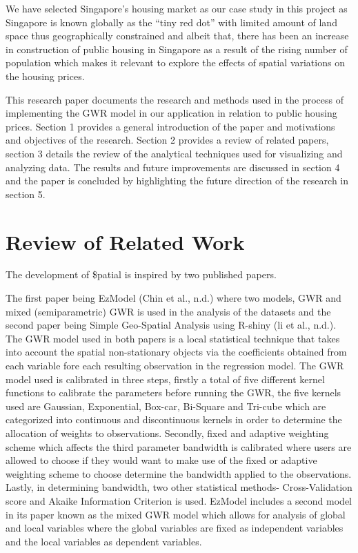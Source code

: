 \documentclass{acm_proc_article-sp}
\begin{document}
We have selected Singapore's housing market as our case study in this
project as Singapore is known globally as the ``tiny red dot'' with
limited amount of land space thus geographically constrained and albeit
that, there has been an increase in construction of public housing in
Singapore as a result of the rising number of population which makes it
relevant to explore the effects of spatial variations on the housing
prices.

This research paper documents the research and methods used in the
process of implementing the GWR model in our application in relation to
public housing prices. Section 1 provides a general introduction of the
paper and motivations and objectives of the research. Section 2 provides
a review of related papers, section 3 details the review of the
analytical techniques used for visualizing and analyzing data. The
results and future improvements are discussed in section 4 and the paper
is concluded by highlighting the future direction of the research in
section 5.

\hypertarget{review-of-related-work}{%
\section{Review of Related Work}\label{review-of-related-work}}

The development of \$patial is inspired by two published papers.

The first paper being EzModel (Chin et al., n.d.) where two models, GWR
and mixed (semiparametric) GWR is used in the analysis of the datasets
and the second paper being Simple Geo-Spatial Analysis using R-shiny (li
et al., n.d.). The GWR model used in both papers is a local statistical
technique that takes into account the spatial non-stationary objects via
the coefficients obtained from each variable fore each resulting
observation in the regression model. The GWR model used is calibrated in
three steps, firstly a total of five different kernel functions to
calibrate the parameters before running the GWR, the five kernels used
are Gaussian, Exponential, Box-car, Bi-Square and Tri-cube which are
categorized into continuous and discontinuous kernels in order to
determine the allocation of weights to observations. Secondly, fixed and
adaptive weighting scheme which affects the third parameter bandwidth is
calibrated where users are allowed to choose if they would want to make
use of the fixed or adaptive weighting scheme to choose determine the
bandwidth applied to the observations. Lastly, in determining bandwidth,
two other statistical methods- Cross-Validation score and Akaike
Information Criterion is used. EzModel includes a second model in its
paper known as the mixed GWR model which allows for analysis of global
and local variables where the global variables are fixed as independent
variables and the local variables as dependent variables.
\end{document}
